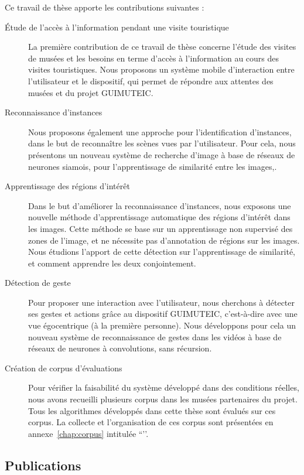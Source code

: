 Ce travail de thèse apporte les contributions suivantes :
\begin{description}
	\item[Étude de l'accès à l'information pendant une visite touristique] La première contribution de ce travail de thèse concerne l'étude des visites de musées et les besoins en terme d'accès à l'information au cours des visites touristiques. Nous proposons un système mobile d'interaction entre l'utilisateur et le dispositif, qui permet de répondre aux attentes des musées et du projet GUIMUTEIC.
	\item[Reconnaissance d'instances] Nous proposons également une approche pour l'identification d'instances, dans le but de reconnaître les scènes vues par l'utilisateur. Pour cela, nous présentons un nouveau système de recherche d'image à base de réseaux de neurones siamois, pour l'apprentissage de similarité entre les images,.
	\item[Apprentissage des régions d'intérêt] Dans le but d'améliorer la reconnaissance d'instances, nous exposons une nouvelle méthode d'apprentissage automatique des régions d'intérêt dans les images. Cette méthode se base sur un apprentissage non supervisé des zones de l'image, et ne nécessite pas d'annotation de régions sur les images. Nous étudions l'apport de cette détection sur l'apprentissage de similarité, et comment apprendre les deux conjointement.
	\item[Détection de geste] Pour proposer une interaction avec l'utilisateur, nous cherchons à détecter ses gestes et actions grâce au dispositif GUIMUTEIC, c'est-à-dire avec une vue égocentrique (à la première personne). Nous développons pour cela un nouveau système de reconnaissance de gestes dans les vidéos à base de réseaux de neurones à convolutions, sans récursion.
	\item[Création de corpus d'évaluations] Pour vérifier la faisabilité du système développé dans des conditions réelles, nous avons recueilli plusieurs corpus dans les musées partenaires du projet. Tous les algorithmes développés dans cette thèse sont évalués sur ces corpus. La collecte et l'organisation de ces corpus sont présentées en annexe~\ref{chap:corpus} intitulée ``’’.
\end{description}


\subsection{Publications}

